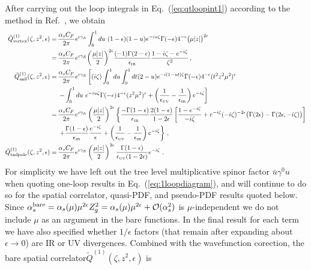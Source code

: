 \documentclass[prd,aps,twocolumn,preprintnumbers,showpacs,nofootinbib,superscriptaddress,notitlepage]{revtex4-1}
\newcommand{\nn}{\nonumber}
\newcommand{\spcorr}{spatial correlator\xspace}
\DeclareRobustCommand{\eq}[1]{Eq.~(\ref{eq:#1})}
\begin{document}
\begin{widetext}
After carrying out the loop integrals in Eq.~(\ref{eq:qtloopint1}) according to the method in Ref.~\cite{Ji:2017rah}, we obtain
\begin{align}\label{eq:1loopdiagram}
\tilde{Q}^{(1)}_{\rm vertex}(\zeta,z^2,\epsilon)
=\,& {\alpha_sC_F\over 2\pi}e^{\epsilon\gamma_E} \int_0^1 du\ (1-\epsilon)(1-u) e^{-iu \zeta}\Gamma(-\epsilon) 4^{-\epsilon} \big(\mu |z|\big)^{2\epsilon}
  \\
 =\,& {\alpha_sC_F\over 2\pi} e^{\epsilon\gamma_E}\biggl({\mu|z|\over2}\biggr)^{2\epsilon}
 \frac{(-1)\Gamma(2-\epsilon)}{\epsilon_{\mbox{\tiny IR}}}
 {1-i\zeta - e^{-i\zeta}\over \zeta^2}
  \,, \nonumber\\
\tilde{Q}^{(1)}_{\rm sail}(\zeta,z^2,\epsilon)
=\, & {\alpha_sC_F\over 2\pi}  e^{\epsilon\gamma_E}\left[(i\zeta) \int_0^1 du \int_0^1 dt (2-u) e^{-i(1-ut)\zeta} \Gamma(-\epsilon) 4^{-\epsilon}(t^2z^2\mu^2)^{\epsilon}\right.
  \nonumber\\
 &\left. -\int_0^1 du \ e^{-iu \zeta}\Gamma(-\epsilon) 4^{-\epsilon}(z^2\mu^2)^{\epsilon}  + \left({1\over\epsilon_{\mbox{\tiny UV}}} - {1\over \epsilon_{\mbox{\tiny IR}}}\right) e^{-i\zeta}\right]
  \nonumber\\
 =\,& {\alpha_sC_F\over 2\pi} e^{\epsilon\gamma_E} \left({\mu|z|\over2}\right)^{2\epsilon}
 \left\{\frac{-\Gamma(1-\epsilon)}{\epsilon_{\mbox{\tiny IR}}}
 {2(1-\epsilon)\over 1-2\epsilon} \left[{1-e^{-i\zeta}\over -i\zeta} + e^{-i\zeta}(-i\zeta)^{-2\epsilon}\big(\Gamma(2\epsilon)-\Gamma(2\epsilon,-i\zeta)\big)
 \right]\right.
  \nn\\
 &\left. + {\Gamma(1-\epsilon)\over \epsilon_{\mbox{\tiny IR}} } \frac{e^{-i\zeta}}{\epsilon} + \left({1\over\epsilon_{\mbox{\tiny UV}}} - {1\over \epsilon_{\mbox{\tiny IR}}}\right) e^{-i\zeta} \right\}
  \,, \nn\\
\tilde{Q}^{(1)}_{\rm tadpole}(\zeta,z^2,\epsilon)
=\, & {\alpha_sC_F\over 2\pi} e^{\epsilon\gamma_E}\left({\mu|z|\over2}\right)^{2\epsilon}  {\Gamma(1-\epsilon)\over \epsilon_{\mbox{\tiny UV}} (1-2\epsilon)}e^{-i\zeta}
 \ . \nn
\end{align}
For simplicity we have left out the tree level multiplicative spinor factor $\bar u\gamma^0 u$ when quoting one-loop results in \eq{1loopdiagram}, and will continue to do so for the \spcorr, quasi-PDF, and pseudo-PDF results quoted below.
Since $\alpha_s^{\rm bare}=\alpha_s(\mu) \mu^{2\epsilon} Z_g^2 = \alpha_s(\mu) \mu^{2\epsilon} + {\cal O}(\alpha_s^2)$ is $\mu$-independent we do not include $\mu$ as an argument in the bare functions.
In the final result for each term we have also specified whether $1/\epsilon$ factors (that remain after expanding about $\epsilon\to 0$) are IR or UV divergences. Combined with the wavefunction corection, the bare \spcorr $\tilde{Q}^{(1)}(\zeta,z^2,\epsilon)$ is

\end{widetext}
\end{document}
